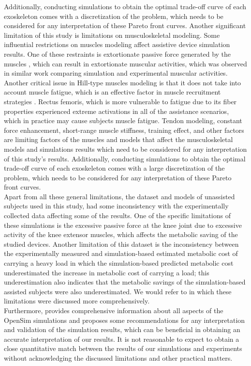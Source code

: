 \documentclass[10pt,letterpaper]{article}
\begin{document}
Additionally, conducting simulations to obtain the optimal trade-off curve of each exoskeleton comes with a discretization of the problem, which needs to be considered for any interpretation of these Pareto front curves. Another significant limitation of this study is limitations on musculoskeletal modeling. Some influential restrictions on muscles modeling affect assistive device simulation results. One of these restraints is extortionate passive force generated by the muscles \cite{92,93}, which can result in extortionate muscular activities, which was observed in similar work \cite{93} comparing simulation and experimental muscular activities. Another critical issue in Hill-type muscles modeling is that it does not take into account muscle fatigue, which is an effective factor in muscle recruitment strategies \cite{92}. Rectus femoris, which is more vulnerable to fatigue due to its fiber properties \cite{123} experienced extreme activations in all of the assistance scenarios, which in practice may cause subjects muscle fatigue\cite{122}. Tendon modeling, constant force enhancement, short-range muscle stiffness, training effect, and other factors \cite{92} are limiting factors of the muscles and models that affect the musculoskeletal models and simulations results which need to be considered for any interpretation of this study's results. Additionally, conducting simulations to obtain the optimal trade-off curve of each exoskeleton comes with a large discretization of the problem, which needs to be considered for any interpretation of these Pareto front curves.\\
Apart from all these general limitations, the dataset and models of unassisted subjects used in this study, had some inconsistency with the experimentally collected data affecting some of the results. One of the specific limitations of these simulations is the excessive passive force at the knee joint due to excessive activity of the knee extensor muscles, which affects the metabolic saving of the studied devices. Another limitation of this dataset is the inconsistency between the experimentally measured and simulation-based estimated metabolic cost of carrying a heavy load in which the simulation-based predicted metabolic cost underestimated the increase in metabolic cost of carrying a load; this underestimation also indicates that the metabolic savings of the simulation-based assisted subjects were also underestimated. We would refer to \cite{93} in which these limitations were discussed more comprehensively.\\
Furthermore,\cite{92} provides comprehensive information about all aspects of the OpenSim simulations and proposes some recommendations for any interpretation and validation of the simulation results, which can be beneficial in obtaining an accurate interpretation of our results. It is not reasonable to expect to obtain a close quantitative match between the results of our simulations and experiments without acknowledging the discussed limitations and other practical matters.
\end{document}
